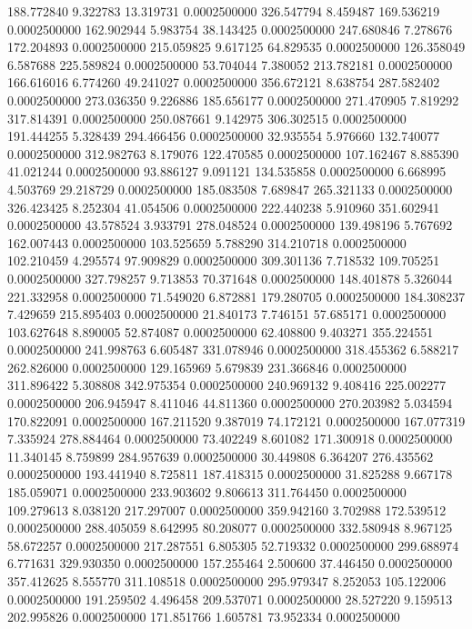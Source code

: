 188.772840 9.322783 13.319731 0.0002500000
326.547794 8.459487 169.536219 0.0002500000
162.902944 5.983754 38.143425 0.0002500000
247.680846 7.278676 172.204893 0.0002500000
215.059825 9.617125 64.829535 0.0002500000
126.358049 6.587688 225.589824 0.0002500000
53.704044 7.380052 213.782181 0.0002500000
166.616016 6.774260 49.241027 0.0002500000
356.672121 8.638754 287.582402 0.0002500000
273.036350 9.226886 185.656177 0.0002500000
271.470905 7.819292 317.814391 0.0002500000
250.087661 9.142975 306.302515 0.0002500000
191.444255 5.328439 294.466456 0.0002500000
32.935554 5.976660 132.740077 0.0002500000
312.982763 8.179076 122.470585 0.0002500000
107.162467 8.885390 41.021244 0.0002500000
93.886127 9.091121 134.535858 0.0002500000
6.668995 4.503769 29.218729 0.0002500000
185.083508 7.689847 265.321133 0.0002500000
326.423425 8.252304 41.054506 0.0002500000
222.440238 5.910960 351.602941 0.0002500000
43.578524 3.933791 278.048524 0.0002500000
139.498196 5.767692 162.007443 0.0002500000
103.525659 5.788290 314.210718 0.0002500000
102.210459 4.295574 97.909829 0.0002500000
309.301136 7.718532 109.705251 0.0002500000
327.798257 9.713853 70.371648 0.0002500000
148.401878 5.326044 221.332958 0.0002500000
71.549020 6.872881 179.280705 0.0002500000
184.308237 7.429659 215.895403 0.0002500000
21.840173 7.746151 57.685171 0.0002500000
103.627648 8.890005 52.874087 0.0002500000
62.408800 9.403271 355.224551 0.0002500000
241.998763 6.605487 331.078946 0.0002500000
318.455362 6.588217 262.826000 0.0002500000
129.165969 5.679839 231.366846 0.0002500000
311.896422 5.308808 342.975354 0.0002500000
240.969132 9.408416 225.002277 0.0002500000
206.945947 8.411046 44.811360 0.0002500000
270.203982 5.034594 170.822091 0.0002500000
167.211520 9.387019 74.172121 0.0002500000
167.077319 7.335924 278.884464 0.0002500000
73.402249 8.601082 171.300918 0.0002500000
11.340145 8.759899 284.957639 0.0002500000
30.449808 6.364207 276.435562 0.0002500000
193.441940 8.725811 187.418315 0.0002500000
31.825288 9.667178 185.059071 0.0002500000
233.903602 9.806613 311.764450 0.0002500000
109.279613 8.038120 217.297007 0.0002500000
359.942160 3.702988 172.539512 0.0002500000
288.405059 8.642995 80.208077 0.0002500000
332.580948 8.967125 58.672257 0.0002500000
217.287551 6.805305 52.719332 0.0002500000
299.688974 6.771631 329.930350 0.0002500000
157.255464 2.500600 37.446450 0.0002500000
357.412625 8.555770 311.108518 0.0002500000
295.979347 8.252053 105.122006 0.0002500000
191.259502 4.496458 209.537071 0.0002500000
28.527220 9.159513 202.995826 0.0002500000
171.851766 1.605781 73.952334 0.0002500000
